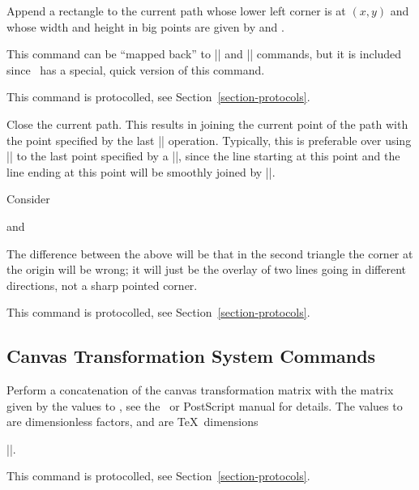 \begin{command}{\pgfsys@rect{}}
  Append a rectangle to the current path whose lower left corner is
  at $(x,y)$ and whose width and height in
  big points are  given by  and .

  This command can be ``mapped back'' to |\pgfsys@moveto| and
  |\pgfsys@lineto| commands, but it is included since \pdf\ has a
  special, quick version of this command.

  This command is protocolled, see Section~\ref{section-protocols}.
\end{command}


\begin{command}{\pgfsys@closepath}
  Close the current path. This results in joining the current point of
  the path with the point specified by the last |\pgfsys@moveto|
  operation. Typically, this is preferable over using |\pgfsys@lineto|
  to the last point specified by a |\pgfsys@moveto|, since the line
  starting at this point and the line ending at this point will be
  smoothly joined by |\pgfsys@closepath|.

  \example Consider
\begin{codeexample}
\pgfsys@moveto{0pt}{0pt}
\pgfsys@lineto{10bp}{10bp}
\pgfsys@lineto{0bp}{10bp}
\pgfsys@closepath
\pgfsys@stroke
\end{codeexample}
  and
\begin{codeexample}
\pgfsys@moveto{0bp}{0bp}
\pgfsys@lineto{10bp}{10bp}
\pgfsys@lineto{0bp}{10bp}
\pgfsys@lineto{0bp}{0bp}
\pgfsys@stroke
\end{codeexample}

  The difference between the above will be that in the second triangle
  the corner at the origin will be wrong; it will just be the overlay
  of two lines going in different directions, not a sharp pointed
  corner.

  This command is protocolled, see Section~\ref{section-protocols}.
\end{command}




\subsection{Canvas Transformation System Commands}

\begin{command}{\pgfsys@transformcm{}}
  Perform a concatenation of the canvas transformation matrix with the
  matrix given by the values  to , see the \pdf\ or
  PostScript manual for details. The values  to  are
  dimensionless factors,  and  are \TeX\ dimensions

  \example ||.

  This command is protocolled, see Section~\ref{section-protocols}.
\end{command}


